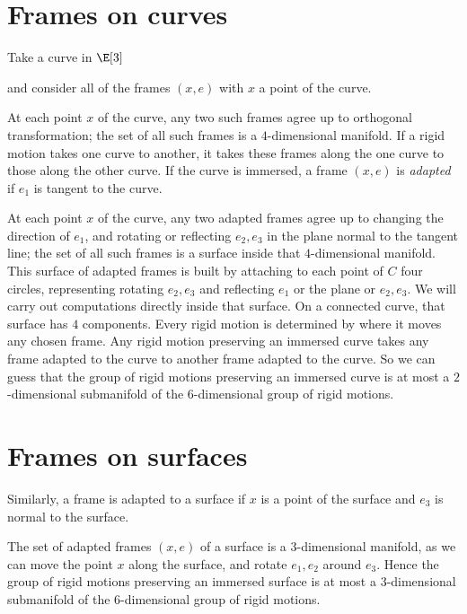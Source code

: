 \section{Frames on curves}
Take a curve in \(\E[3]\)
\begin{center}

\end{center}
and consider all of the frames \((x,e)\) with \(x\) a point of the curve.
\begin{center}

\end{center}
At each point \(x\) of the curve, any two such frames agree up to orthogonal transformation; the set of all such frames is a \(4\)-dimensional manifold.
If a rigid motion takes one curve to another, it takes these frames along the one curve to those along the other curve.
If the curve is immersed, a frame \((x,e)\) is \emph{adapted} if \(e_1\) is tangent to the curve.
\begin{center}

\end{center}
At each point \(x\) of the curve, any two adapted frames agree up to changing the direction of \(e_1\), and rotating or reflecting \(e_2,e_3\) in the plane normal to the tangent line; the set of all such frames is a surface inside that \(4\)-dimensional manifold.
This surface of adapted frames is built by attaching to each point of \(C\) four circles, representing rotating \(e_2,e_3\)  and reflecting \(e_1\) or the plane or \(e_2,e_3\).
We will carry out computations directly inside that surface.
On a connected curve, that surface has \(4\) components.
Every rigid motion is determined by where it moves any chosen frame.
Any rigid motion preserving an immersed curve takes any frame adapted to the curve to another frame adapted to the curve.
So we can guess that the group of rigid motions preserving an immersed curve is at most a \(2\)-dimensional submanifold of the \(6\)-dimensional group of rigid motions.

\section{Frames on surfaces}
Similarly, a frame is adapted to a surface if \(x\) is a point of the surface and \(e_3\) is normal to the surface.
\begin{center}

\end{center}
The set of adapted frames \((x,e)\) of a surface is a \(3\)-dimensional manifold, as we can move the point \(x\) along the surface, and rotate \(e_1,e_2\) around \(e_3\).
Hence the group of rigid motions preserving an immersed surface is at most a \(3\)-dimensional submanifold of the \(6\)-dimensional group of rigid motions.

